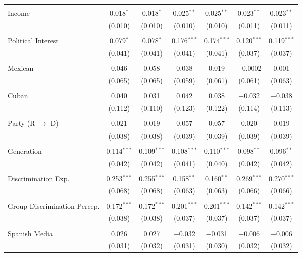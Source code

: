 \begin{table}[!htbp]
\begin{tabular}{@{\extracolsep{5pt}}lcccccc}
  & & & & & & \\ 
 Income & 0.018$^{*}$ & 0.018$^{*}$ & 0.025$^{**}$ & 0.025$^{**}$ & 0.023$^{**}$ & 0.023$^{**}$ \\ 
  & (0.010) & (0.010) & (0.010) & (0.010) & (0.011) & (0.011) \\ 
  & & & & & & \\ 
 Political Interest & 0.079$^{*}$ & 0.078$^{*}$ & 0.176$^{***}$ & 0.174$^{***}$ & 0.120$^{***}$ & 0.119$^{***}$ \\ 
  & (0.041) & (0.041) & (0.041) & (0.041) & (0.037) & (0.037) \\ 
  & & & & & & \\ 
 Mexican & 0.046 & 0.058 & 0.038 & 0.019 & $-$0.0002 & 0.001 \\ 
  & (0.065) & (0.065) & (0.059) & (0.061) & (0.061) & (0.063) \\ 
  & & & & & & \\ 
 Cuban & 0.040 & 0.031 & 0.042 & 0.038 & $-$0.032 & $-$0.038 \\ 
  & (0.112) & (0.110) & (0.123) & (0.122) & (0.114) & (0.113) \\ 
  & & & & & & \\ 
 Party (R $\longrightarrow$ D) & 0.021 & 0.019 & 0.057 & 0.057 & 0.020 & 0.019 \\ 
  & (0.038) & (0.038) & (0.039) & (0.039) & (0.039) & (0.039) \\ 
  & & & & & & \\ 
 Generation & 0.114$^{***}$ & 0.109$^{***}$ & 0.108$^{***}$ & 0.110$^{***}$ & 0.098$^{**}$ & 0.096$^{**}$ \\ 
  & (0.042) & (0.042) & (0.041) & (0.040) & (0.042) & (0.042) \\ 
  & & & & & & \\ 
 Discrimination Exp. & 0.253$^{***}$ & 0.255$^{***}$ & 0.158$^{**}$ & 0.160$^{**}$ & 0.269$^{***}$ & 0.270$^{***}$ \\ 
  & (0.068) & (0.068) & (0.063) & (0.063) & (0.066) & (0.066) \\ 
  & & & & & & \\ 
 Group Discrimination Percep. & 0.172$^{***}$ & 0.172$^{***}$ & 0.201$^{***}$ & 0.201$^{***}$ & 0.142$^{***}$ & 0.142$^{***}$ \\ 
  & (0.038) & (0.038) & (0.037) & (0.037) & (0.037) & (0.037) \\ 
  & & & & & & \\ 
 Spanish Media & 0.026 & 0.027 & $-$0.032 & $-$0.031 & $-$0.006 & $-$0.006 \\ 
  & (0.031) & (0.032) & (0.031) & (0.030) & (0.032) & (0.032) \\ 

\end{tabular}
\end{table}
